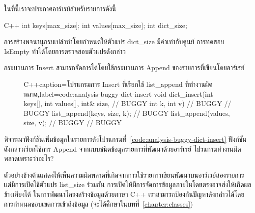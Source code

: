 ใน{\wbr}ที่นี้{\wbr}เรา{\wbr}จะ{\wbr}ประกาศ{\wbr}อาร์เรย์{\wbr}สำหรับ{\wbr}รายการ{\wbr}ดังนี้{\wbr}
\latintext
\begin{codelist}{C++}{}
int keys[max_size];
int values[max_size];
int dict_size;
\end{codelist}
\thaitext

การ{\wbr}สร้าง{\wbr}พจนานุกรม{\wbr}เปล่า{\wbr}ทำ{\wbr}โดย{\wbr}กำหนด{\wbr}ให้{\wbr}ตัวแปร {\ct dict\_size} มี{\wbr}ค่า{\wbr}เท่า{\wbr}กับ{\wbr}ศูนย์{\wbr}
การ{\wbr}ทดสอบ IsEmpty ทำ{\wbr}ได้{\wbr}โดย{\wbr}การ{\wbr}ตรวจสอบ{\wbr}ตัวแปร{\wbr}ดังกล่าว{\wbr}

กระบวนการ Insert สามารถ{\wbr}จัดการ{\wbr}ได้{\wbr}โดย{\wbr}ใช้{\wbr}กระบวนการ Append ของ{\wbr}รายการ{\wbr}ที่{\wbr}เขียน{\wbr}โดย{\wbr}อาร์เรย์

\begin{figure}
\latintext
\begin{codelist}{C++}{caption={\thaitext โปรแกรม{\wbr}การ Insert ที่{\wbr}เรียก{\wbr}ใช้ {\ct list\_append} ที่ทำงาน{\wbr}ผิดพลาด\latintext},label=code:analysis-buggy-dict-insert}
void dict_insert(int keys[], int values[], int& size,  // BUGGY
                 int k, int v)                         // BUGGY
{                                                      // BUGGY
  list_append(keys, size, k);                          // BUGGY
  list_append(values, size, v);                        // BUGGY 
}                                                      // BUGGY
\end{codelist}
\thaitext
\end{figure}

\begin{quiz}{}
พิจารณา{\wbr}ฟังก์ชัน{\wbr}เพิ่ม{\wbr}ข้อมูล{\wbr}ใน{\wbr}รายการ{\wbr}ดัง{\wbr}โปรแกรม{\wbr}ที่~\ref{code:analysis-buggy-dict-insert}
ฟังก์ชัน{\wbr}ดังกล่าว{\wbr}เรียก{\wbr}ใช้{\wbr}การ Append จาก{\wbr}แบบ{\wbr}ชนิด{\wbr}ข้อมูล{\wbr}รายการ{\wbr}ที่{\wbr}พัฒนา{\wbr}ด้วย{\wbr}อาร์เรย์
โปรแกรม{\wbr}ทำงาน{\wbr}ผิดพลาด{\wbr}เพราะว่า{\wbr}อะไร? 
\end{quiz}

ตัวอย่าง{\wbr}ข้างต้น{\wbr}แสดง{\wbr}ให้{\wbr}เห็น{\wbr}ความผิด{\wbr}พลาด{\wbr}ที่{\wbr}เกิด{\wbr}จาก{\wbr}การ{\wbr}ใช้{\wbr}รายการ{\wbr}เขียน{\wbr}พัฒนา{\wbr}บน{\wbr}อาร์เรย์{\wbr}สอง{\wbr}รายการ{\wbr}
แต่{\wbr}มี{\wbr}การ{\wbr}เปิด{\wbr}ใช้{\wbr}ตัวแปร {\ct list\_size} ร่วม{\wbr}กัน{\wbr}
การ{\wbr}เปิด{\wbr}ให้{\wbr}มี{\wbr}การ{\wbr}จัดการ{\wbr}ข้อมูล{\wbr}ภายใน{\wbr}โดย{\wbr}ตรง{\wbr}อาจ{\wbr}ส่ง{\wbr}ให้{\wbr}เกิด{\wbr}ผลข้างเคียง{\wbr}ได้{\wbr}
ใน{\wbr}การ{\wbr}พัฒนา{\wbr}โครงสร้าง{\wbr}ข้อมูล{\wbr}ด้วย{\wbr}ภาษา C++
เรา{\wbr}สามารถ{\wbr}ป้องกัน{\wbr}ปัญหา{\wbr}ดังกล่าว{\wbr}ได้{\wbr}โดย{\wbr}การ{\wbr}กำหนด{\wbr}ขอบเขต{\wbr}การ{\wbr}เข้าถึง{\wbr}ข้อมูล{\wbr}
(จะ{\wbr}ได้{\wbr}ศึกษา{\wbr}ใน{\wbr}บท{\wbr}ที่~\ref{chapter:classes})

